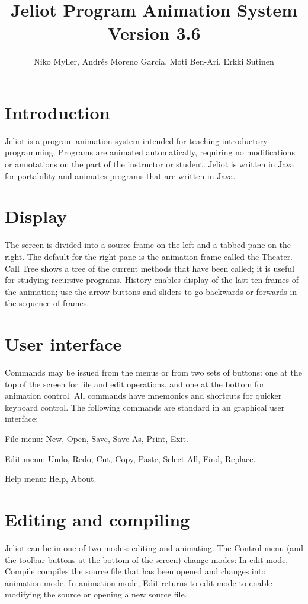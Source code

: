 \documentclass{article}
\title{Jeliot Program Animation System\\Version 3.6}
\author{Niko Myller, Andr{\'{e}}s Moreno Garc{\'{i}}a, Moti Ben-Ari, Erkki Sutinen}
\begin{document}
\maketitle

\section{Introduction}

Jeliot is a program animation system intended for teaching introductory 
programming. Programs are animated automatically, requiring no modifications or 
annotations on the part of the instructor or student. Jeliot is written in Java 
for portability and animates programs that are written in Java.

\section{Display}

The screen is divided into a source frame on the left and a tabbed pane on the 
right. The default for the right pane is the animation frame called the 
Theater. Call Tree shows a tree of the current methods that have been called; 
it is useful for studying recursive programs. History enables display of the 
last ten frames of the animation; use the arrow buttons and sliders to go 
backwards or forwards in the sequence of frames.

\section{User interface}
Commands may be issued from the menus or from two sets of buttons: one at the 
top of the screen for file and edit operations, and one at the bottom for 
animation control. All commands have mnemonics and shortcuts for quicker 
keyboard control. The following commands are standard in an graphical user 
interface:

File menu: New, Open, Save, Save As, Print, Exit.

Edit menu: Undo, Redo, Cut, Copy, Paste, Select All, Find, Replace.

Help menu: Help, About.

\section{Editing and compiling}
Jeliot can be in one of two modes: editing and animating. The Control menu (and 
the toolbar buttons at the bottom of the screen) change modes: In edit mode, 
Compile compiles the source file that has been opened and changes into 
animation mode. In animation mode, Edit returns to edit mode to enable 
modifying the source or opening a new source file.
\end{document}

